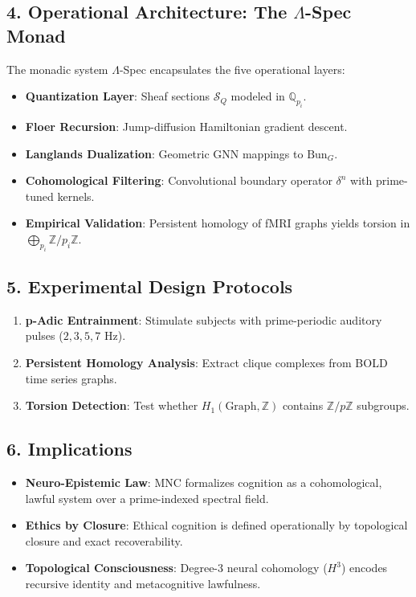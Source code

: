 \documentclass{article}
\theoremstyle{plain}
\begin{document}
\subsection{4. Operational Architecture: The $\Lambda$-Spec Monad}

The monadic system $\Lambda$-Spec encapsulates the five operational layers:

\begin{itemize}
    \item \textbf{Quantization Layer}: Sheaf sections $\mathcal{S}_Q$ modeled in $\mathbb{Q}_{p_i}$.
    \item \textbf{Floer Recursion}: Jump-diffusion Hamiltonian gradient descent.
    \item \textbf{Langlands Dualization}: Geometric GNN mappings to $\text{Bun}_G$.
    \item \textbf{Cohomological Filtering}: Convolutional boundary operator $\delta^n$ with prime-tuned kernels.
    \item \textbf{Empirical Validation}: Persistent homology of fMRI graphs yields torsion in $\bigoplus_{p_i} \mathbb{Z}/p_i\mathbb{Z}$.
\end{itemize}

\subsection{5. Experimental Design Protocols}

\begin{enumerate}
    \item \textbf{p-Adic Entrainment}: Stimulate subjects with prime-periodic auditory pulses ($2, 3, 5, 7$ Hz).
    \item \textbf{Persistent Homology Analysis}: Extract clique complexes from BOLD time series graphs.
    \item \textbf{Torsion Detection}: Test whether $H_1(\text{Graph}, \mathbb{Z})$ contains $\mathbb{Z}/p\mathbb{Z}$ subgroups.
\end{enumerate}

\subsection{6. Implications}

\begin{itemize}
    \item \textbf{Neuro-Epistemic Law}: MNC formalizes cognition as a cohomological, lawful system over a prime-indexed spectral field.
    \item \textbf{Ethics by Closure}: Ethical cognition is defined operationally by topological closure and exact recoverability.
    \item \textbf{Topological Consciousness}: Degree-3 neural cohomology ($H^3$) encodes recursive identity and metacognitive lawfulness.
\end{itemize}
\end{document}
